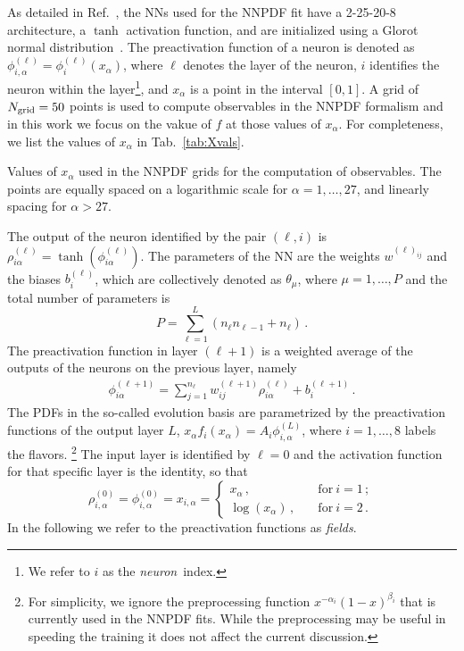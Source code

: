 As detailed in Ref.~\cite{NNPDF:2021njg}, the NNs used for the NNPDF fit have a 2-25-20-8 architecture,
a $\tanh$ activation function,
and are initialized using a Glorot normal distribution~\cite{glorot2010understanding}. The preactivation
function of a neuron is denoted as $\phi^{(\ell)}_{i,\alpha} = \phi^{(\ell)}_i(x_\alpha)$, where $\ell$
denotes the layer of the neuron, $i$ identifies the neuron within the layer\footnote{We refer
to $i$ as the {\em neuron}\ index.}, and $x_{\alpha}$ is a point in the interval $[0,1]$.
A grid of $N_{\mathrm{grid}}=50$ points is used to compute observables in the NNPDF formalism and in this work 
we focus on the vakue of $f$ at those values of $x_\alpha$. For completeness, we list the values of $x_\alpha$ in
Tab.~\ref{tab:Xvals}.

\begin{table}[ht]
    \centering
    
    \caption{Values of $x_\alpha$ used in the NNPDF grids for the computation of
    observables. The points are equally spaced on a logarithmic scale
    for $\alpha = 1, \ldots, 27$, and linearly spacing for $\alpha > 27$.
    \label{tab:Xvals}}
\end{table}

The output of the neuron identified by the pair $(\ell,i)$ is
$\rho^{(\ell)}_{i\alpha} = \tanh\left(\phi^{(\ell)}_{i\alpha}\right)$.
The parameters of the NN are the weights $w^{(\ell)_{ij}}$ and the biases $b^{(\ell)}_i$, which are
collectively denoted as $\theta_\mu$, where $\mu = 1, \ldots, P$ and the total number of parameters
is
\begin{equation}
    \label{eq:TotPar}
    P = \sum_{\ell=1}^{L} \left(n_{\ell} n_{\ell-1} + n_\ell\right)\, .
\end{equation}
The preactivation function in layer $(\ell+1)$ is a weighted average of the outputs of the neurons on 
the previous layer, namely
\begin{align}
    \label{eq:RecursionNN}
    \phi^{(\ell+1)}_{i\alpha} = \sum_{j=1}^{n_\ell} w^{(\ell+1)}_{ij} \rho^{(\ell)}_{i\alpha} + b^{(\ell+1)}_{i}\, .
\end{align}
The PDFs in the
so-called evolution basis are parametrized by the preactivation functions of the output layer $L$,
$x_\alpha f_i(x_\alpha)=A_i \phi^{(L)}_{i,\alpha}$, where $i=1, \ldots, 8$ labels the flavors.
\footnote{For simplicity, we ignore the preprocessing function $x^{-\alpha_i} (1-x)^{\beta_i}$ that
is currently used in the NNPDF fits. While the preprocessing may be useful in speeding the training
it does not affect the current discussion.}
The input layer is identified by $\ell=0$ and the activation
function for that specific layer is the identity, so that
\begin{equation}
    \label{eq:InitLayerPhi}
    \rho^{(0)}_{i,\alpha} = \phi^{(0)}_{i,\alpha} = x_{i,\alpha} =
    \begin{cases}
        x_\alpha\, , \quad &\text{for}\ i=1\, ;\\
        \log\left(x_\alpha\right)\, , \quad &\text{for}\ i=2\, .
    \end{cases}
\end{equation}
In the following we refer to the preactivation functions as {\em fields}.

